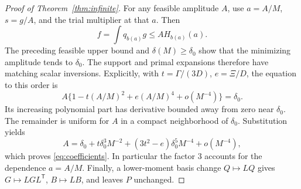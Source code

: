 \begin{proof}[Proof of Theorem~\ref{thm:infinite}]
For any feasible amplitude \(A\), use
\(a=A/M\), \(s=g/A\), and the trial multiplier at that \(a\). Then
\[
 f=\int q_{b(a)}g\leq A H_{b(a)}(a).
\]
The preceding feasible upper bound and \(\delta(M)\geq\delta_0\)
show that the minimizing amplitude tends to \(\delta_0\).
The support and primal expansions therefore have matching scalar
inversions. Explicitly, with
\(t=\Gamma/(3D)\), \(e=\Xi/D\), the equation to this order is
\[
 A\{1-t(A/M)^2+e(A/M)^4+o(M^{-4})\}=\delta_0 .
\]
Its increasing polynomial part has derivative bounded away from zero
near \(\delta_0\). The remainder is uniform for \(A\) in a compact
neighborhood of \(\delta_0\). Substitution yields
\[
 A=\delta_0+t\delta_0^3M^{-2}
                   +(3t^2-e)\delta_0^5M^{-4}+o(M^{-4}),
\]
which proves \eqref{eq:coefficients}. In particular the factor \(3\)
accounts for the dependence \(a=A/M\).
Finally, a lower-moment basis change \(Q\mapsto LQ\) gives
\(G\mapsto LGL^{\mathsf T}\), \(B\mapsto LB\), and leaves \(P\) unchanged.
\end{proof}

